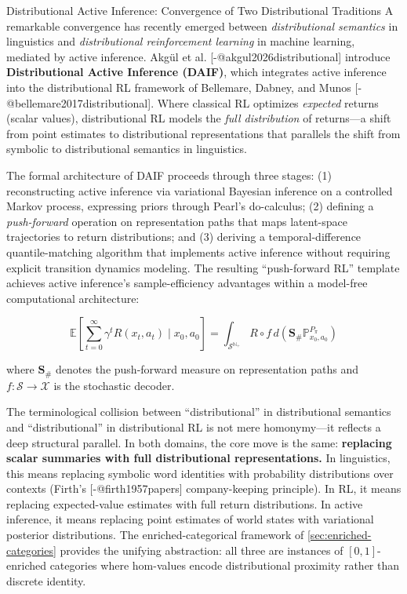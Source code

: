 \documentclass[
  ignorenonframetext,
]{beamer}
\begin{document}
\begin{frame}{Distributional Active Inference: Convergence of Two
Distributional Traditions}
\protect{}\label{distributional-active-inference-convergence-of-two-distributional-traditions}
A remarkable convergence has recently emerged between
\emph{distributional semantics} in linguistics and \emph{distributional
reinforcement learning} in machine learning, mediated by active
inference. Akgül et al. {[}-@akgul2026distributional{]} introduce
\textbf{Distributional Active Inference (DAIF)}, which integrates active
inference into the distributional RL framework of Bellemare, Dabney, and
Munos {[}-@bellemare2017distributional{]}. Where classical RL optimizes
\emph{expected} returns (scalar values), distributional RL models the
\emph{full distribution} of returns---a shift from point estimates to
distributional representations that parallels the shift from symbolic to
distributional semantics in linguistics.

The formal architecture of DAIF proceeds through three stages: (1)
reconstructing active inference via variational Bayesian inference on a
controlled Markov process, expressing priors through Pearl's
do-calculus; (2) defining a \emph{push-forward} operation on
representation paths that maps latent-space trajectories to return
distributions; and (3) deriving a temporal-difference quantile-matching
algorithm that implements active inference without requiring explicit
transition dynamics modeling. The resulting ``push-forward RL'' template
achieves active inference's sample-efficiency advantages within a
model-free computational architecture:

\[\mathbb{E}\left[\sum_{t=0}^{\infty} \gamma^t R(x_t, a_t) \mid x_0, a_0\right] = \int_{\mathcal{S}^{\mathbb{N}_+}} R \circ f \, d(\mathbf{S}_{\#} \mathbb{P}_{x_0, a_0}^{P_\pi}) \tag{7.1}\]

where \(\mathbf{S}_{\#}\) denotes the push-forward measure on
representation paths and \(f: \mathcal{S} \to \mathcal{X}\) is the
stochastic decoder.

The terminological collision between ``distributional'' in
distributional semantics and ``distributional'' in distributional RL is
not mere homonymy---it reflects a deep structural parallel. In both
domains, the core move is the same: \textbf{replacing scalar summaries
with full distributional representations.} In linguistics, this means
replacing symbolic word identities with probability distributions over
contexts (Firth's {[}-@firth1957papers{]} company-keeping principle). In
RL, it means replacing expected-value estimates with full return
distributions. In active inference, it means replacing point estimates
of world states with variational posterior distributions. The
enriched-categorical framework of \autoref{sec:enriched-categories}
provides the unifying abstraction: all three are instances of
\([0,1]\)-enriched categories where hom-values encode distributional
proximity rather than discrete identity.


\end{frame}
\end{document}
